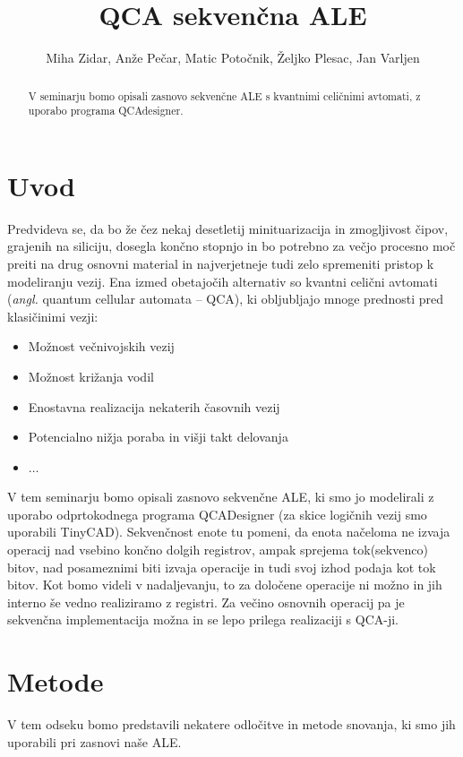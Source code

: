 \documentclass[seminar, slovene]{FRIreport}
\newcommand{\angl}[1]{(\textit{angl.} #1)}
\begin{document}
\title{QCA sekven\v cna ALE}

\author{Miha Zidar, Anže Pečar, Matic Potočnik, Željko Plesac, Jan Varljen}


\begin{abstract}
V seminarju bomo opisali zasnovo sekvenčne ALE s kvantnimi celičnimi avtomati, z uporabo programa QCAdesigner.

\end{abstract}

%
\section{Uvod}
Predvideva se, da bo že čez nekaj desetletij minituarizacija in zmogljivost čipov, grajenih na siliciju, dosegla končno stopnjo in bo potrebno za večjo procesno moč preiti na drug osnovni material in najverjetneje tudi zelo spremeniti pristop k modeliranju vezij. Ena izmed obetajočih alternativ so kvantni celični avtomati \angl{quantum cellular automata -- QCA}, ki obljubljajo mnoge prednosti pred klasičinimi vezji:
\begin{itemize}
\item Možnost večnivojskih vezij
\item Možnost križanja vodil
\item Enostavna realizacija nekaterih časovnih vezij
\item Potencialno nižja poraba in višji takt delovanja
\item $\dots$
\end{itemize}
V tem seminarju bomo opisali zasnovo sekvenčne ALE, ki smo jo modelirali z uporabo odprtokodnega programa QCADesigner\cite{walus:2004} (za skice logičnih vezij smo uporabili TinyCAD). Sekvenčnost enote tu pomeni, da enota načeloma ne izvaja operacij nad vsebino končno dolgih registrov, ampak sprejema tok(sekvenco) bitov, nad posameznimi biti izvaja operacije in tudi svoj izhod podaja kot tok bitov. Kot bomo videli v nadaljevanju, to za določene operacije ni možno in jih interno še vedno realiziramo z registri. Za večino osnovnih operacij pa je sekvenčna implementacija možna in se lepo prilega realizaciji s QCA-ji.

%
\section{Metode}
V tem odseku bomo predstavili nekatere odločitve in metode snovanja, ki smo jih uporabili pri zasnovi naše ALE.
\end{document}
